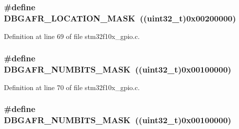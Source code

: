 \subsubsection[{\texorpdfstring{D\+B\+G\+A\+F\+R\+\_\+\+L\+O\+C\+A\+T\+I\+O\+N\+\_\+\+M\+A\+SK}{DBGAFR_LOCATION_MASK}}]{\setlength{\rightskip}{0pt plus 5cm}\#define D\+B\+G\+A\+F\+R\+\_\+\+L\+O\+C\+A\+T\+I\+O\+N\+\_\+\+M\+A\+SK~(({\bf uint32\+\_\+t})0x00200000)}\hypertarget{group___g_p_i_o___private___defines_gaab83406f875057e96458940ca9519b7d}{}\label{group___g_p_i_o___private___defines_gaab83406f875057e96458940ca9519b7d}


Definition at line 69 of file stm32f10x\+\_\+gpio.\+c.

\subsubsection[{\texorpdfstring{D\+B\+G\+A\+F\+R\+\_\+\+N\+U\+M\+B\+I\+T\+S\+\_\+\+M\+A\+SK}{DBGAFR_NUMBITS_MASK}}]{\setlength{\rightskip}{0pt plus 5cm}\#define D\+B\+G\+A\+F\+R\+\_\+\+N\+U\+M\+B\+I\+T\+S\+\_\+\+M\+A\+SK~(({\bf uint32\+\_\+t})0x00100000)}\hypertarget{group___g_p_i_o___private___defines_gaea2fa480dea4d6e061eaa1417a9196dc}{}\label{group___g_p_i_o___private___defines_gaea2fa480dea4d6e061eaa1417a9196dc}


Definition at line 70 of file stm32f10x\+\_\+gpio.\+c.

\subsubsection[{\texorpdfstring{D\+B\+G\+A\+F\+R\+\_\+\+N\+U\+M\+B\+I\+T\+S\+\_\+\+M\+A\+SK}{DBGAFR_NUMBITS_MASK}}]{\setlength{\rightskip}{0pt plus 5cm}\#define D\+B\+G\+A\+F\+R\+\_\+\+N\+U\+M\+B\+I\+T\+S\+\_\+\+M\+A\+SK~(({\bf uint32\+\_\+t})0x00100000)}\hypertarget{group___g_p_i_o___private___defines_gaea2fa480dea4d6e061eaa1417a9196dc}{}\label{group___g_p_i_o___private___defines_gaea2fa480dea4d6e061eaa1417a9196dc}


